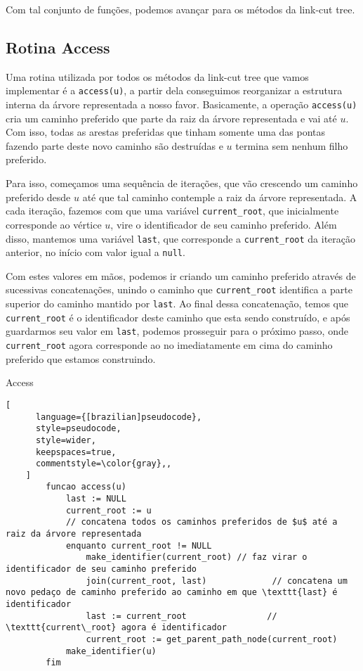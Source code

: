 Com tal conjunto de funções, podemos avançar para os métodos da link-cut tree.

\subsection{Rotina Access}
\label{subsection:lct-access}

Uma rotina utilizada por todos os métodos da link-cut tree que vamos implementar é a \texttt{access(u)}, a partir dela conseguimos reorganizar a estrutura interna da árvore representada a nosso favor. Basicamente, a operação \texttt{access(u)} cria um caminho preferido que parte da raiz da árvore representada e vai até $u$. Com isso, todas as arestas preferidas que tinham somente uma das pontas fazendo parte deste novo caminho são destruídas e $u$ termina sem nenhum filho preferido.

Para isso, começamos uma sequência de iterações, que vão crescendo um caminho preferido desde $u$ até que tal caminho contemple a raiz da árvore representada. A cada iteração, fazemos com que uma variável \texttt{current\_root}, que inicialmente corresponde ao vértice $u$, vire o identificador de seu caminho preferido. Além disso, mantemos uma variável \texttt{last}, que corresponde a \texttt{current\_root} da iteração anterior, no início com valor igual a \texttt{null}.

Com estes valores em mãos, podemos ir criando um caminho preferido através de sucessivas concatenações, unindo o caminho que \texttt{current\_root} identifica a parte superior do caminho mantido por \texttt{last}. Ao final dessa concatenação, temos que \texttt{current\_root} é o identificador deste caminho que esta sendo construído, e após guardarmos seu valor em \texttt{last}, podemos prosseguir para o próximo passo, onde \texttt{current\_root} agora corresponde ao no imediatamente em cima do caminho preferido que estamos construindo.

\begin{programruledcaption}{Access\label{lct:access}}
    \begin{lstlisting}[
      language={[brazilian]pseudocode},
      style=pseudocode,
      style=wider,
      keepspaces=true,
      commentstyle=\color{gray},,
    ]
        funcao access(u)
            last := NULL
            current_root := u
            // concatena todos os caminhos preferidos de $u$ até a raiz da árvore representada
            enquanto current_root != NULL
                make_identifier(current_root) // faz virar o identificador de seu caminho preferido 
                join(current_root, last)             // concatena um novo pedaço de caminho preferido ao caminho em que \texttt{last} é identificador
                last := current_root                // \texttt{current\_root} agora é identificador
                current_root := get_parent_path_node(current_root)
            make_identifier(u)
        fim
    \end{lstlisting}
\end{programruledcaption}

